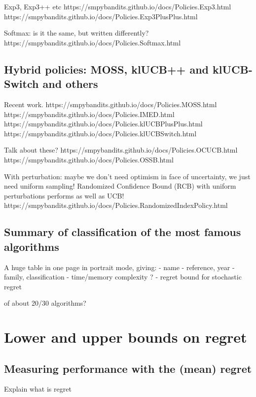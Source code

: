 Exp3, Exp3++ etc
https://smpybandits.github.io/docs/Policies.Exp3.html
https://smpybandits.github.io/docs/Policies.Exp3PlusPlus.html

Softmax: is it the same, but written differently?
https://smpybandits.github.io/docs/Policies.Softmax.html


\subsection{Hybrid policies: MOSS, klUCB++ and klUCB-Switch and others}

Recent work.
https://smpybandits.github.io/docs/Policies.MOSS.html
https://smpybandits.github.io/docs/Policies.IMED.html
https://smpybandits.github.io/docs/Policies.klUCBPlusPlus.html
https://smpybandits.github.io/docs/Policies.klUCBSwitch.html

Talk about these?
https://smpybandits.github.io/docs/Policies.OCUCB.html
https://smpybandits.github.io/docs/Policies.OSSB.html

With perturbation: maybe we don't need optimism in face of uncertainty, we just need uniform sampling!
Randomized Confidence Bound (RCB) with uniform perturbations performs as well as UCB!
https://smpybandits.github.io/docs/Policies.RandomizedIndexPolicy.html


\subsection{Summary of classification of the most famous algorithms}

A huge table in one page in portrait mode, giving:
- name
- reference, year
- family, classification
- time/memory complexity ?
- regret bound for stochastic regret

of about 20/30 algorithms?


\section{Lower and upper bounds on regret}
\label{sec:2:lowerUpperBoundsRegret}


\subsection{Measuring performance with the (mean) regret}
Explain what is regret


